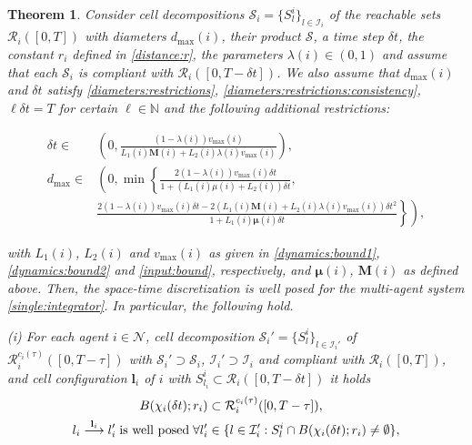 \documentclass[reqno]{amsart}
\theoremstyle{plain}
\newtheorem{thm}{Theorem}[section]
\theoremstyle{definition}
\numberwithin{equation}{section}
\begin{document}
\begin{thm}\label{discretizations:for:planning}
Consider cell decompositions $\mathcal{S}_i=\{S_l^i\}_{l\in{\ensuremath{\mathcal{I}}}_i}$ of the reachable sets ${\ensuremath{\mathcal{R}}}_i([0,T])$ with diameters $d_{\max}(i)$, their product ${\ensuremath{\mathcal{S}}}$, a time step $\delta t$, the constant $r_i$ defined in \eqref{distance:r}, the parameters $\lambda(i)\in(0,1)$ and assume that each ${\ensuremath{\mathcal{S}}}_i$ is compliant with ${\ensuremath{\mathcal{R}}}_i([0,T-\delta t])$. We also assume that $d_{\max}(i)$ and $\delta t$ satisfy \eqref{diameters:restrictions}, \eqref{diameters:restrictions:consistency}, $\ell \delta t=T$ for certain $\ell\in\mathbb{N}$ and the following additional restrictions:

\begin{align}
\delta t \in & \left(0,\frac{(1-\lambda(i))v_{\max}(i)}{L_1(i){\textbf{{M}}}(i)+L_2(i)\lambda(i)v_{\max}(i)}\right), \label{deltat:interval} \\
d_{\max} \in & \left(0,\min\left\lbrace \frac{2(1-\lambda(i))v_{\max}(i)\delta t}{1+(L_1(i)\mu(i)+L_2(i))\delta t},\right.\right. \nonumber \\
& \left.\left.\frac{2(1-\lambda(i))v_{\max}(i)\delta t-2(L_1(i){\textbf{{M}}}(i)+L_2(i)\lambda(i)v_{\max}(i)) \delta t^2}{1+L_1(i){\ensuremath{\boldsymbol{{\mu}}}}(i)\delta t} \right\rbrace\right), \label{dmax:interval}
\end{align}

\noindent with $L_1(i)$, $L_2(i)$ and $v_{\max}(i)$ as given in \eqref{dynamics:bound1}, \eqref{dynamics:bound2} and \eqref{input:bound}, respectively,  and ${\ensuremath{\boldsymbol{{\mu}}}}(i)$, ${\textbf{{M}}}(i)$ as defined above. Then, the space-time discretization is well posed for the multi-agent system \eqref{single:integrator}. In particular, the following hold. 

\noindent \textit{(i)} For each agent $i\in{\ensuremath{\mathcal{N}}}$, cell decomposition ${\ensuremath{\mathcal{S}}}_i'=\{S_{l}^i\}_{l\in{\ensuremath{\mathcal{I}}}_i'}$ of ${\ensuremath{\mathcal{R}}}_i^{c_i(\tau)}([0,T-\tau])$ with ${\ensuremath{\mathcal{S}}}_i'\supset{\ensuremath{\mathcal{S}}}_i$, ${\ensuremath{\mathcal{I}}}_i'\supset{\ensuremath{\mathcal{I}}}_i$ and compliant with ${\ensuremath{\mathcal{R}}}_i([0,T])$, and cell configuration ${\textbf{{l}}}_i$ of $i$ with $S_{l_i}^i\subset{\ensuremath{\mathcal{R}}}_i([0,T-\delta t])$ it holds
\begin{align} 
 B(\chi_i(\delta t);r_i) & \subset {\ensuremath{\mathcal{R}}}_i^{c_i(\tau)}([0,T-\tau]), \label{reachball:inclusion}\\
l_i\overset{{\textbf{{l}}}_i}{\longrightarrow}l_i'\;\textup{is well posed}\; \forall l_i' & \in \{l\in{\ensuremath{\mathcal{I}}}_i':S_l^i\cap B(\chi_i(\delta t);r_i)\ne\emptyset\}, \label{planning:condition}
\end{align}


\end{thm}
\end{document}
